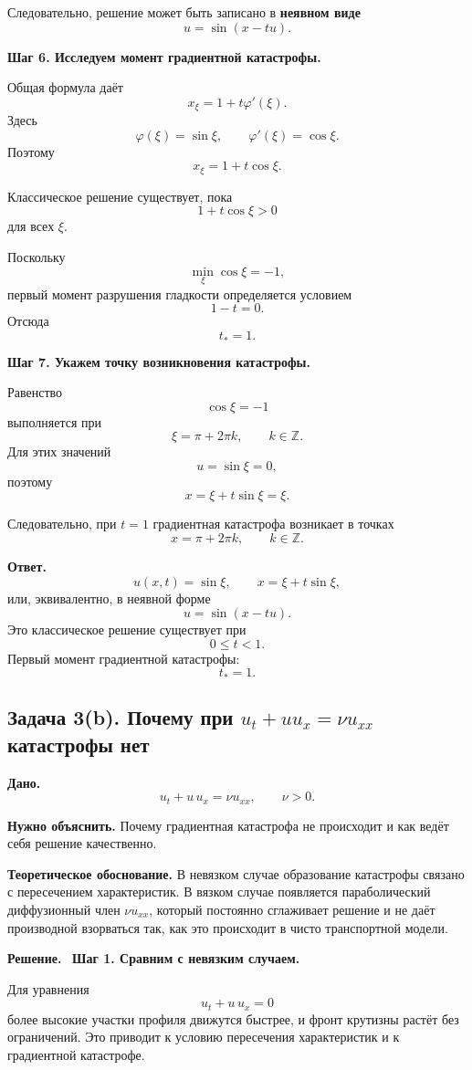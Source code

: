 \documentclass[a4paper,12pt]{article}
\newcommand{\Solution}{\textbf{Решение.}\ }
\begin{document}
Следовательно, решение может быть записано в \textbf{неявном виде}
\[
u=\sin(x-tu).
\]

\textbf{Шаг 6. Исследуем момент градиентной катастрофы.}

Общая формула даёт
\[
x_\xi=1+t\varphi'(\xi).
\]
Здесь
\[
\varphi(\xi)=\sin \xi,
\qquad
\varphi'(\xi)=\cos \xi.
\]
Поэтому
\[
x_\xi=1+t\cos \xi.
\]

Классическое решение существует, пока
\[
1+t\cos \xi>0
\]
для всех $\xi$.

Поскольку
\[
\min_\xi \cos \xi=-1,
\]
первый момент разрушения гладкости определяется условием
\[
1-t=0.
\]
Отсюда
\[
t_*=1.
\]

\textbf{Шаг 7. Укажем точку возникновения катастрофы.}

Равенство
\[
\cos \xi=-1
\]
выполняется при
\[
\xi=\pi+2\pi k,
\qquad k\in\mathbb{Z}.
\]
Для этих значений
\[
u=\sin \xi=0,
\]
поэтому
\[
x=\xi+t\sin \xi=\xi.
\]

Следовательно, при $t=1$ градиентная катастрофа возникает в точках
\[
x=\pi+2\pi k,
\qquad k\in\mathbb{Z}.
\]

\textbf{Ответ.}
\[
u(x,t)=\sin \xi,
\qquad
x=\xi+t\sin \xi,
\]
или, эквивалентно, в неявной форме
\[
u=\sin(x-tu).
\]
Это классическое решение существует при
\[
0\le t<1.
\]
Первый момент градиентной катастрофы:
\[
t_*=1.
\]

\subsection*{Задача 3(b). Почему при \texorpdfstring{$u_t+u u_x=\nu u_{xx}$}{ut+u ux=nu uxx} катастрофы нет}

\textbf{Дано.}
\[
u_t+u\,u_x=\nu u_{xx},
\qquad \nu>0.
\]

\textbf{Нужно объяснить.} Почему градиентная катастрофа не происходит и как ведёт себя решение качественно.

\textbf{Теоретическое обоснование.}
В невязком случае образование катастрофы связано с пересечением характеристик. В вязком случае появляется параболический диффузионный член $\nu u_{xx}$, который постоянно сглаживает решение и не даёт производной взорваться так, как это происходит в чисто транспортной модели.

\Solution
\textbf{Шаг 1. Сравним с невязким случаем.}

Для уравнения
\[
u_t+u\,u_x=0
\]
более высокие участки профиля движутся быстрее, и фронт крутизны растёт без ограничений. Это приводит к условию пересечения характеристик и к градиентной катастрофе.
\end{document}

